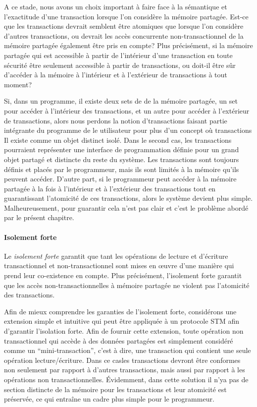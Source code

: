 A ce stade, nous avons un choix important à faire face à la sémantique et l'exactitude d'une transaction lorsque l'on considère la mémoire partagée.
Est-ce que les transactions devrait semblent être atomiques que lorsque l'on considère d'autres transactions, ou devrait les accès concurrente non-transactionnel de la mémoire partagée également être pris en compte?
Plus précisément, si la mémoire partagée qui est accessible à partir de l'intérieur d'une transaction en
toute sécurité être seulement accessible à partir de transactions, ou doit-il être sûr d'accéder à la mémoire à l'intérieur et à l'extérieur de transactions à tout moment?


Si, dans un programme, il existe deux sets de de la mémoire partagée, un set pour accéder à l'intérieur des transactions,
et un autre pour accéder à l'extérieur de transactions, alors nous perdons la notion d'transactions faisant partie
intégrante du programme de le utilisateur pour plus d'un concept où transactions Il existe comme un objet distinct isolé.
Dans le second cas, les transactions pourraient représenter une interface de programmation définie pour un grand objet partagé et distincte du reste du système.
Les transactions sont toujours définis et placés par le programmeur, mais ils sont limités à la mémoire qu'ils peuvent accéder.
D'autre part, si le programmeur peut accéder à la mémoire partagée à la fois à l'intérieur et à l'extérieur des transactions
tout en guarantissant l'atomicité de ces transactions, alors le système devient plus simple.
Malheureusement, pour guarantir cela n'est pas clair et c'est le problème abordé par le présent chapitre.



\paragraph{Isolement forte}

Le \emph{isolement forte} garantit que tant les opérations de lecture et d'écriture transactionnel et non-transactionnel sont mises en œuvre d'une manière qui prend leur co-existence en compte.
Plus précisément, l'isolement forte garantit que les accès non-transactionnelles à mémoire partagée ne violent pas l'atomicité des transactions.



Afin de mieux comprendre les garanties de l'isolement forte, considérons une extension simple et intuitive qui peut être appliquée à un protocole STM afin d'garantir l'isolation forte.
Afin de fournir cette extension, toute opération non transactionnel qui accède à des données partagées est simplement considéré comme un ``mini-transaction'', c'est à dire, une transaction qui contient une seule opération lecture/écriture.
Dans ce casles transactions devront être conformes non seulement par rapport à d'autres transactions, mais aussi par rapport à les opérations non transactionnelles.
Évidemment, dans cette solution il n'ya pas de section distincte de la mémoire pour les transactions et leur atomicité est préservée, ce qui entraîne un cadre plus simple pour le programmeur.


